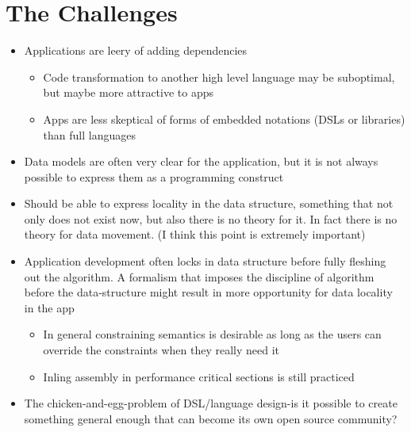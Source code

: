 \section{The Challenges}
\begin{itemize}
  \item Applications are leery of adding dependencies
    \begin{itemize}
      \item Code transformation to another high level language may be suboptimal, but maybe more attractive to apps
      \item Apps are less skeptical of forms of embedded notations (DSLs or libraries) than full languages
    \end{itemize}
  \item Data models are often very clear for the application, but it is not always possible to express them as a programming construct
  \item Should be able to express locality in the data structure, something that not only does not exist now, but also there is no theory for
  it.
    In fact there is no theory for data movement. (I think this point is extremely important)
  \item Application development often locks in data structure before fully fleshing out the algorithm.
    A formalism that imposes the discipline of algorithm before the data-structure might result in more opportunity for data locality in the app
    \begin{itemize}
      \item In general constraining semantics is desirable as long as the users can override the constraints when they really need it
      \item Inling assembly in performance critical sections is still practiced
    \end{itemize}
  \item The chicken-and-egg-problem of DSL/language design-is it possible to create something general enough that can become its own open source
   community?
\end{itemize}

